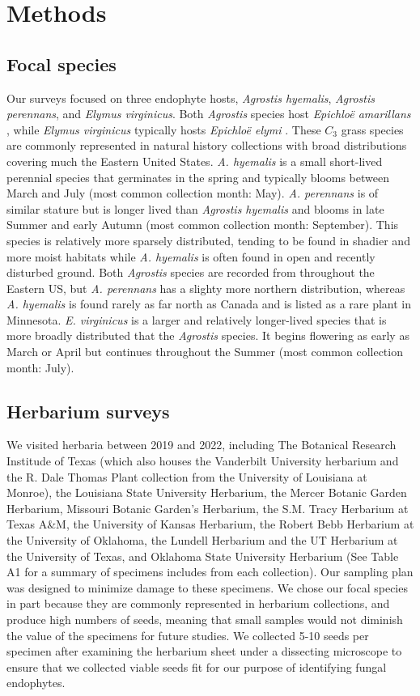 \documentclass[11pt]{article}
\begin{document}
\section*{Methods}
        \subsection*{Focal species}
Our surveys focused on three endophyte hosts, \emph{Agrostis hyemalis}, \emph{Agrostis perennans}, and \emph{Elymus virginicus}. Both \emph{Agrostis} species host \emph{Epichloë amarillans} \cite{craven2001multigene, leuchtmann2014nomenclatural}, while \emph{Elymus virginicus} typically hosts \emph{Epichloë elymi} \cite{clay2002evolutionary}.
These $C_3$ grass species are commonly represented in natural history collections with broad distributions covering much the Eastern United States.
\emph{A. hyemalis} is a small short-lived perennial species that germinates in the spring and typically blooms between March and July (most common collection month: May).
\emph{A. perennans} is of similar stature but is longer lived than \emph{Agrostis hyemalis} and blooms in late Summer and early Autumn (most common collection month: September). 
This species is relatively more sparsely distributed, tending to be found in shadier and more moist habitats while \emph{A. hyemalis} is often found in open and recently disturbed ground. 
Both \emph{Agrostis} species are recorded from throughout the Eastern US, but \emph{A. perennans} has a slighty more northern distribution, whereas \emph{A. hyemalis} is found rarely as far north as Canada and is listed as a rare plant in Minnesota.
\emph{E. virginicus} is a larger and relatively longer-lived  species that is more broadly distributed that the \emph{Agrostis} species. 
It begins flowering as early as March or April but continues throughout the Summer (most common collection month: July).

		\subsection*{Herbarium surveys}
We visited herbaria between 2019 and 2022, including The Botanical Research Institude of Texas (which also houses the Vanderbilt University herbarium and the R. Dale Thomas Plant collection from the University of Louisiana at Monroe), the Louisiana State University Herbarium, the Mercer Botanic Garden Herbarium, Missouri Botanic Garden's Herbarium, the S.M. Tracy Herbarium at Texas A\&M, the University of Kansas Herbarium, the Robert Bebb Herbarium at the University of Oklahoma, the Lundell Herbarium and the UT Herbarium at the University of Texas, and Oklahoma State University Herbarium (See Table A1 for a summary of specimens includes from each collection).
Our sampling plan was designed to minimize damage to these specimens.
We chose our focal species in part because they are commonly represented in herbarium collections, and produce high numbers of seeds, meaning that small samples would not diminish the value of the specimens for future studies. 
We collected 5-10 seeds per specimen after examining the herbarium sheet under a dissecting microscope to ensure that we collected viable seeds fit for our purpose of identifying fungal endophytes.
\end{document}
